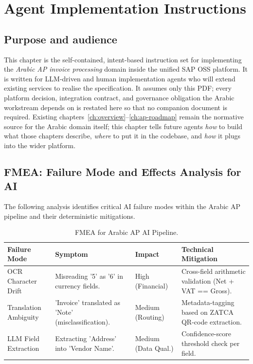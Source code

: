 \documentclass[11pt,a4paper,twoside]{report}
\begin{document}
\chapter{Agent Implementation Instructions}\label{ch:agent-impl}

\section{Purpose and audience}
This chapter is the self-contained, intent-based instruction set for
implementing the \emph{Arabic AP invoice processing} domain inside the
unified SAP OSS platform. It is written for LLM-driven and human
implementation agents who will extend existing services to realise the
specification. It assumes only this PDF; every platform decision,
integration contract, and governance obligation the Arabic workstream
depends on is restated here so that no companion document is required.
Existing chapters~\ref{ch:overview}--\ref{ch:ap-roadmap} remain the
normative source for the Arabic domain itself; this chapter tells
future agents \emph{how} to build what those chapters describe,
\emph{where} to put it in the codebase, and \emph{how} it plugs into
the wider platform.



\section{FMEA: Failure Mode and Effects Analysis for AI}
\label{sec:fmea-ai}

The following analysis identifies critical AI failure modes within the Arabic AP pipeline and their deterministic mitigations.

\begin{table}[htbp]
\centering
\footnotesize
\caption{FMEA for Arabic AP AI Pipeline.}
\label{tab:arabic-fmea}
\begin{tabularx}{\textwidth}{@{}l X X X@{}}
\toprule
\textbf{Failure Mode} & \textbf{Symptom} & \textbf{Impact} & \textbf{Technical Mitigation} \\
\midrule
OCR Character Drift & Misreading '5' as '6' in currency fields. & High (Financial) & Cross-field arithmetic validation (Net + VAT == Gross). \\
Translation Ambiguity & 'Invoice' translated as 'Note' (misclassification). & Medium (Routing) & Metadata-tagging based on ZATCA QR-code extraction. \\
LLM Field Extraction & Extracting 'Address' into 'Vendor Name'. & Medium (Data Qual.) & Confidence-score threshold check per field. \\
\bottomrule
\end{tabularx}
\end{table}
\end{document}
